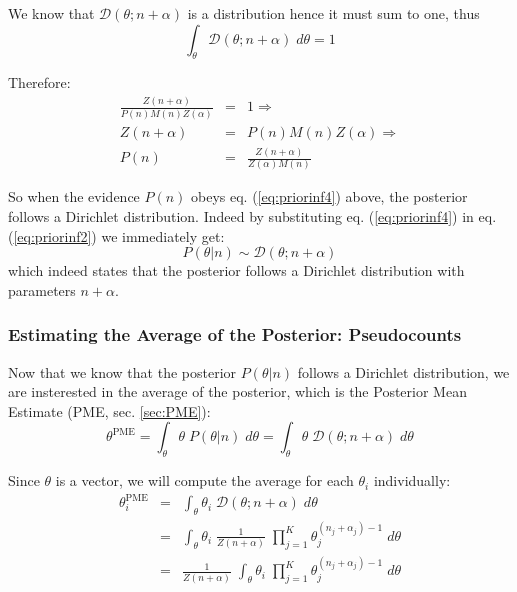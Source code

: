 We know that $\mathcal{D}(\theta; n + \alpha)$ is a distribution hence it must sum to one, thus
\begin{equation}
\int_\theta \mathcal{D}(\theta; n + \alpha) \; d\theta = 1
\end{equation}

Therefore:
\begin{eqnarray}
\frac{Z(n + \alpha)}{P(n) M(n) Z(\alpha)} & = & 1
\Rightarrow \\
Z(n + \alpha) & = & P(n) M(n) Z(\alpha)
\Rightarrow \\
P(n) & = &\frac{Z(n + \alpha)}{Z(\alpha) M(n)}
\label{eq:priorinf4}
\end{eqnarray}

So when the evidence $P(n)$ obeys eq. (\ref{eq:priorinf4}) above, the posterior follows a Dirichlet distribution. Indeed by substituting eq. (\ref{eq:priorinf4}) in eq. (\ref{eq:priorinf2}) we immediately get:
\begin{equation}
P(\theta|n) \sim \mathcal{D}(\theta; n + \alpha)
\label{eq:posterior:dirichlet}
\end{equation}
which indeed states that the posterior follows a Dirichlet distribution with parameters $n + \alpha$.

\subsubsection{Estimating the Average of the Posterior: Pseudocounts}
\label{sec:pseudocounts}

Now that we know that the posterior $P(\theta|n)$ follows a Dirichlet distribution, we are insterested in the average of the posterior, which is the Posterior Mean Estimate (PME, sec. \ref{sec:PME}):
%
\begin{equation}
\theta^{\text{PME}} 
= \int_{\theta} \theta \; P(\theta|n) \; d \theta 
= \int_{\theta} \theta \; \mathcal{D}(\theta; n + \alpha) \; d \theta 
\label{eq:thetapme1}
\end{equation}

Since $\theta$ is a vector, we will compute the average for each $\theta_i$ individually:
\begin{eqnarray}
\theta_i^{\text{PME}} & = & 
\int_{\theta} \theta_i \; \mathcal{D}(\theta; n + \alpha) \; d \theta 
\label{eq:thetapme2}
\\
& = &
\int_{\theta} \theta_i \; 
\frac{1}{Z(n + \alpha)} \;
\prod_{j=1}^K \theta_j ^ {(n_j + \alpha_j) - 1}
\; d \theta 
\\
& = &
\frac{1}{Z(n + \alpha)} \;
\int_{\theta} \theta_i \; 
\prod_{j=1}^K \theta_j ^ {(n_j + \alpha_j) - 1}
\; d \theta 
\end{eqnarray}

